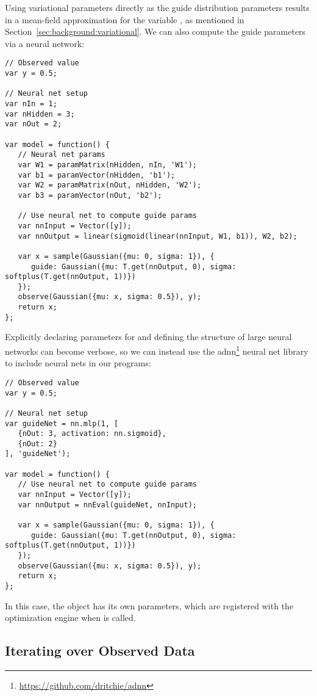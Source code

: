 Using variational parameters directly as the guide distribution parameters results in a mean-field approximation for the variable , as mentioned in Section~\ref{sec:background:variational}.
We can also compute the guide parameters via a neural network:~
\begin{lstlisting}
// Observed value
var y = 0.5;

// Neural net setup
var nIn = 1;
var nHidden = 3;
var nOut = 2;

var model = function() {
   // Neural net params
   var W1 = paramMatrix(nHidden, nIn, 'W1');
   var b1 = paramVector(nHidden, 'b1');
   var W2 = paramMatrix(nOut, nHidden, 'W2');
   var b3 = paramVector(nOut, 'b2');

   // Use neural net to compute guide params
   var nnInput = Vector([y]);
   var nnOutput = linear(sigmoid(linear(nnInput, W1, b1)), W2, b2);

   var x = sample(Gaussian({mu: 0, sigma: 1}), {
      guide: Gaussian({mu: T.get(nnOutput, 0), sigma: softplus(T.get(nnOutput, 1))})
   });
   observe(Gaussian({mu: x, sigma: 0.5}), y);
   return x;
};
\end{lstlisting}
Explicitly declaring parameters for and defining the structure of large neural networks can become verbose, so we can instead use the adnn\footnote{\url{https://github.com/dritchie/adnn}} neural net library to include neural nets in our programs:
\begin{lstlisting}
// Observed value
var y = 0.5;

// Neural net setup
var guideNet = nn.mlp(1, [
   {nOut: 3, activation: nn.sigmoid},
   {nOut: 2}
], 'guideNet');

var model = function() {
   // Use neural net to compute guide params
   var nnInput = Vector([y]);
   var nnOutput = nnEval(guideNet, nnInput);

   var x = sample(Gaussian({mu: 0, sigma: 1}), {
      guide: Gaussian({mu: T.get(nnOutput, 0), sigma: softplus(T.get(nnOutput, 1))})
   });
   observe(Gaussian({mu: x, sigma: 0.5}), y);
   return x;
};
\end{lstlisting}
In this case, the  object has its own parameters, which are registered with the optimization engine when  is called.

\subsection{Iterating over Observed Data}

